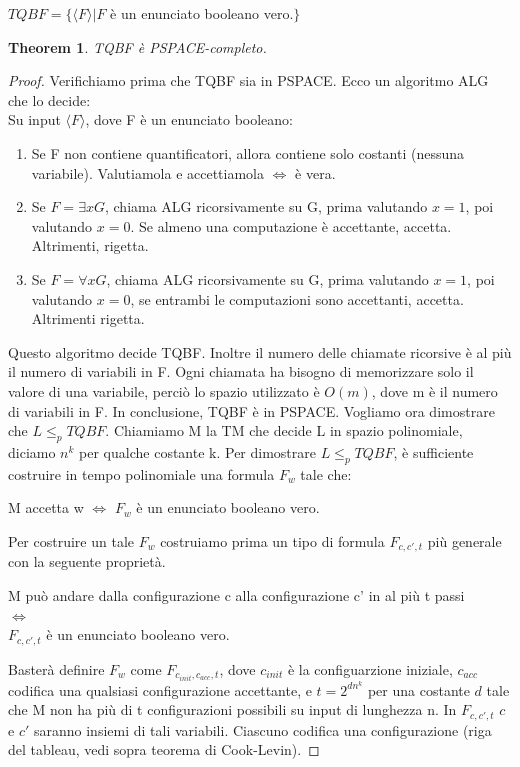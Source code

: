 \documentclass[a4paper, 12pt]{article}
\newtheorem{theorem}{Theorem}[section]
\begin{document}
\begin{center}
$TQBF = \{\langle F \rangle | F$ \`e un enunciato booleano vero.$ \}$
\end{center}
\begin{theorem}
TQBF \`e PSPACE-completo.
\end{theorem}
\begin{proof}
Verifichiamo prima che TQBF sia in PSPACE. Ecco un algoritmo ALG che lo decide:\\
Su input $\langle F \rangle$, dove F \`e un enunciato booleano:
\begin{enumerate}
\item Se F non contiene quantificatori, allora contiene solo costanti (nessuna variabile). Valutiamola e accettiamola $\iff$ \`e vera.
\item Se $F = \exists x G$, chiama ALG ricorsivamente su G, prima valutando $x = 1$, poi valutando $x = 0$. Se almeno una computazione \`e accettante, accetta. Altrimenti, rigetta.
\item Se $F = \forall x G$, chiama ALG ricorsivamente su G, prima valutando $x = 1$, poi valutando $x = 0$, se entrambi le computazioni sono accettanti, accetta. Altrimenti rigetta.
\end{enumerate}
Questo algoritmo decide TQBF. Inoltre il numero delle chiamate ricorsive \`e al pi\`u il numero di variabili in F. Ogni chiamata ha bisogno di memorizzare solo il valore di una variabile, perci\`o lo spazio utilizzato \`e $O(m)$, dove m \`e il numero di variabili in F. In conclusione, TQBF \`e in PSPACE. Vogliamo ora dimostrare che $L \leq_p TQBF$. Chiamiamo M la TM che decide L in spazio polinomiale, diciamo $n^k$ per qualche costante k. Per dimostrare $L \leq_p TQBF$, \`e sufficiente costruire in tempo polinomiale una formula $F_w$ tale che:
\begin{center}
M accetta w $\iff$ $F_w$ \`e un enunciato booleano vero.
\end{center}
Per costruire un tale $F_w$ costruiamo prima un tipo di formula $F_{c,c',t}$ pi\`u generale con la seguente propriet\`a.
\begin{center}
M pu\`o andare dalla configurazione c alla configurazione c' in al pi\`u t passi  \\$\iff$ \\ $F_{c,c',t}$ \`e un enunciato booleano vero.
\end{center}
Baster\`a definire $F_w$ come $F_{c_{init},c_{acc},t}$, dove $c_{init}$ \`e la configuarzione iniziale, $c_{acc}$ codifica una qualsiasi configurazione accettante, e $t = 2^{dn^k}$ per una costante $d$ tale che M non ha pi\`u di t configurazioni possibili su input di lunghezza n. In $F_{c,c',t}$ $c$ e $c'$ saranno insiemi di tali variabili. Ciascuno codifica una configurazione (riga del tableau, vedi sopra teorema di Cook-Levin).

\end{proof}
\end{document}
